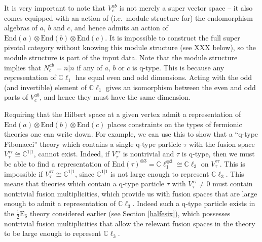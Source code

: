 \documentclass[12pt,a4paper]{article}
\newcommand{\tp}{\otimes}
\newcommand{\cc}{\mathbb{C}}
\newcommand{\End}{\text{End}}
\newcommand{\cl}{\mathbb{C}\ell}
\newcommand{\halfesix}{\frac{1}{2}\text{E}_6}
\begin{document}
\medskip

It is very important to note that $V^{ab}_c$ is not merely a super vector space -- it also comes equipped with an action
of (i.e.\ module structure for) the endomorphism algebras of $a$, $b$ and $c$, and hence admits an action of $\End(a)\tp \End(b)\tp \End(c)$. 
It is impossible to construct the full super pivotal category without knowing this module structure (see XXX below), 
so the module
structure is part of the input data.
Note that the module structure implies that $N^{ab}_c = n|n$ if any of $a$, $b$ or $c$ is q-type.
This is because any representation of $\cl_1$ has equal even and odd dimensions.
Acting with the odd (and invertible) element of $\cl_1$ gives an isomorphism between the even and odd parts of $V^{ab}_c$, and hence they must have the same dimension.

Requiring that the Hilbert space at a given vertex admit a 
representation of $\End(a)\tp \End(b)\tp \End(c)$ places constraints on the types 
of fermionic theories one can write down. 
For example, we can use this to show that a ``q-type Fibonacci'' theory 
which contains a single q-type particle $\tau$ with the fusion space $V^{\tau\tau}_{\tau}\cong \cc^{1|1}$, cannot exist. 
Indeed, if $V^{\tau\tau}_{\tau}$ is nontrivial and $\tau$ is q-type, 
then we must be able to find a representation of $\End(\tau)^{\tp 3} = \cl_1^{\tp 3} \cong \cl_3$ on $V^{\tau\tau}_{\tau}$.
This is impossible if $V^{\tau\tau}_{\tau}\cong \cc^{1|1}$, since $\cc^{1|1}$ is not large enough to represent $\cl_3$. 
This means that theories which contain a q-type particle $\tau$ with $V^{\tau\tau}_{\tau}\neq0$ must contain nontrivial 
fusion multiplicities, which provide us with fusion spaces that are large enough to admit a representation of $\cl_3$.
Indeed such a q-type particle exists in the $\halfesix$ theory considered earlier (see Section \ref{halfesix}), 
which possesses nontrivial fusion multiplicities that allow the relevant fusion spaces in the theory to be large enough to represent $\cl_3$. 



\medskip
\end{document}
